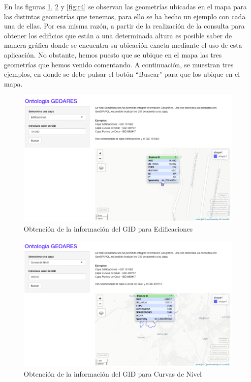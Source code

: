 





En las figuras \ref{fig:r2}, \ref{fig:r3} y \ref{fig:r4} se observan las geometrías ubicadas en el mapa para las distintas geometrías que tenemos, para ello se ha hecho un ejemplo con cada una de ellas. Por esa misma razón, a partir de la realización de la consulta para obtener los edificios que están a una determinada altura es posible saber de manera gráfica donde se encuentra su ubicación exacta mediante el uso de esta aplicación. No obstante, hemos puesto que se ubique en el mapa las tres geometrías que hemos venido comentando. A continuación, se muestran tres ejemplos, en donde se debe pulsar el botón ``Buscar" para que los ubique en el mapa.

\begin{figure}[H]
	\centering
	\includegraphics[width=1\linewidth]{imagenes/capitulo5/R2}
	\caption{Obtención de la información del GID para Edificaciones}
	\label{fig:r2}
\end{figure}

\begin{figure}[H]
	\centering
	\includegraphics[width=1\linewidth]{imagenes/capitulo5/R3}
	\caption{Obtención de la información del GID para Curvas de Nivel}
	\label{fig:r3}
\end{figure}

